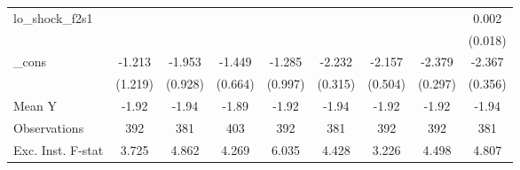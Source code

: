 {\begin{tabular}{l*{8}{c}}
\addlinespace
lo\_shock\_f2s1&                     &                     &                     &                     &                     &                     &                     &       0.002         \\
            &                     &                     &                     &                     &                     &                     &                     &     (0.018)         \\
\addlinespace
\_cons      &      -1.213         &      -1.953\sym{**} &      -1.449\sym{**} &      -1.285         &      -2.232\sym{***}&      -2.157\sym{***}&      -2.379\sym{***}&      -2.367\sym{***}\\
            &     (1.219)         &     (0.928)         &     (0.664)         &     (0.997)         &     (0.315)         &     (0.504)         &     (0.297)         &     (0.356)         \\
\midrule
Mean Y      &       -1.92         &       -1.94         &       -1.89         &       -1.92         &       -1.94         &       -1.92         &       -1.92         &       -1.94         \\
Observations&         392         &         381         &         403         &         392         &         381         &         392         &         392         &         381         \\
Exc. Inst. F-stat&       3.725         &       4.862         &       4.269         &       6.035         &       4.428         &       3.226         &       4.498         &       4.807         \\
\bottomrule
\end{tabular}
}
